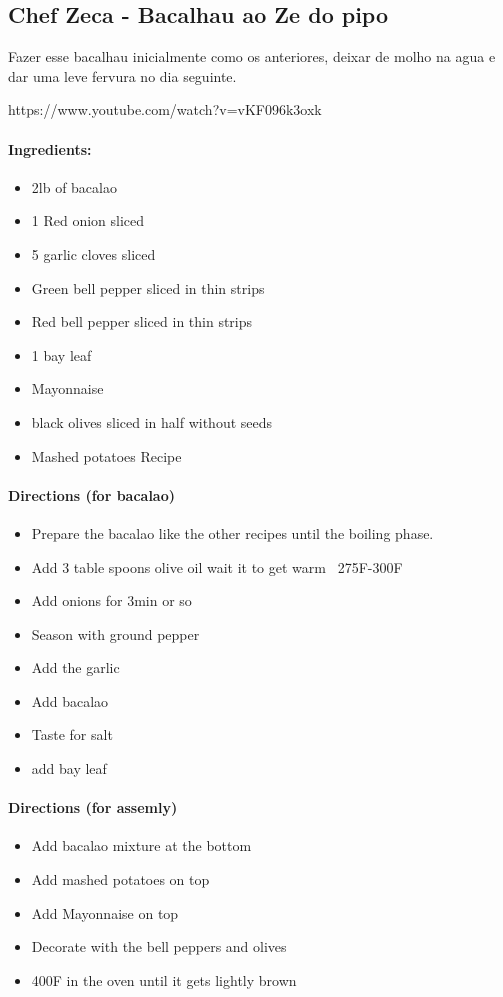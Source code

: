 \documentclass{article}
\begin{document}
\subsection{Chef Zeca - Bacalhau ao Ze do pipo}

Fazer esse bacalhau inicialmente como os anteriores, deixar de molho na agua e dar uma leve fervura no dia seguinte.

https://www.youtube.com/watch?v=vKF096k3oxk

\paragraph{Ingredients:}

\begin{itemize}
	\item 2lb of bacalao
	\item 1 Red onion sliced
	\item 5 garlic cloves sliced
	\item Green bell pepper sliced in thin strips
	\item Red bell pepper sliced in thin strips
	\item 1 bay leaf
	\item Mayonnaise
	\item black olives sliced in half without seeds
	\item Mashed potatoes Recipe
\end{itemize}

\paragraph{Directions (for bacalao)}
\begin{itemize}
	\item Prepare the bacalao like the other recipes until the boiling phase.
	\item Add 3 table spoons olive oil wait it to get warm ~275F-300F
	\item Add onions for 3min or so
	\item Season with ground pepper
	\item Add the garlic
	\item Add bacalao
	\item Taste for salt
	\item add bay leaf
\end{itemize}


\paragraph{Directions (for assemly)}
\begin{itemize}
	\item Add bacalao mixture at the bottom
	\item Add mashed potatoes on top
	\item Add Mayonnaise on top
	\item Decorate with the bell peppers and olives
	\item 400F in the oven until it gets lightly brown
\end{itemize}
\end{document}

